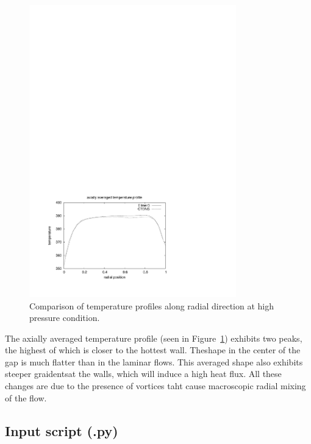 \begin{figure}[htbp]
\begin{center}
\includegraphics[width=0.8\textwidth,viewport=41 46 411 298,clip=true]{../3D/taylor-couette/temperature-high.pdf}
\end{center}
\caption{Comparison of temperature profiles along radial direction at high pressure condition.}
\label{tch-temperature-fig}
\end{figure}

\medskip
The axially averaged temperature profile (seen in Figure~\ref{tch-temperature-fig}) exhibits two peaks, the highest of which 
is closer to the hottest wall. Theshape in the center of the gap is much flatter than in the laminar flows. This averaged shape 
also exhibits steeper graidentsat the walls, which will induce a high heat flux. All these changes are due to the presence of 
vortices taht cause macroscopic radial mixing of the flow.

\newpage
\subsection{Input script (.py)}
\topbar

\bottombar


